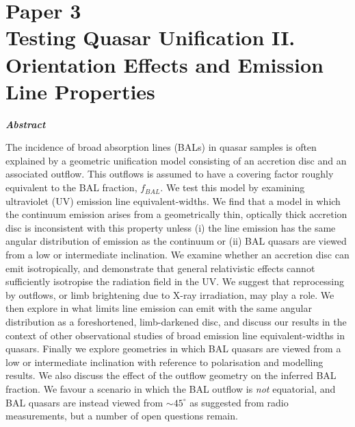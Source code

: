 \chapter{Paper 3 \\ Testing Quasar Unification II. Orientation Effects and Emission Line Properties}

\def\py{\textsc{python}}
\def\tar{\textsc{tardis}}
\def\cld{\textsc{cloudy}}
\def\agn{\textsc{agnspec}}
\def\kerrtrans{\textsc{kerrtrans}}


\def\civ{C~\textsc{iv}}
\def\nv{N~\textsc{v}}
\def\heii{He~\textsc{ii}}
\def\ovi{O~\textsc{vi}}
\def\la{Ly$\alpha$}
\def\ha{H$\alpha$}
\def\ept{$\epsilon(\theta)$}

\def\araa{ARAA}
\def\nat{Nature}
\def\apjl{ApJ Letters}
\def\aapr{AAPR}
\def\ssr{SSR}
\def\apj{ApJ}
\def\apjs{ApJs}
\def\pasp{PASP}
\def\aap{A\&A}
\def\mnras{MNRAS}
\def\aj{AJ}
\def\rmxaa{RMXAA}
\def\ew{{\rm EW}}


%
%
\maketitle

\clearpage

{\bf{\sl{\huge Abstract}}}

The incidence of broad absorption lines (BALs) in quasar samples is 
often explained by a geometric unification model consisting
of an accretion disc and an associated outflow.
This outflows is assumed to have a covering factor roughly equivalent to
the BAL fraction, $f_{BAL}$. We test this model
by examining ultraviolet (UV) emission line equivalent-widths. 
We find that a model in which the 
continuum emission arises from a geometrically thin, 
optically thick accretion disc is inconsistent with this property
unless (i) the line emission has the same angular distribution of 
emission as the continuum or (ii) BAL quasars are viewed from a low or intermediate inclination. 
We examine whether an accretion disc can emit isotropically, and
demonstrate that general relativistic effects cannot sufficiently isotropise the 
radiation field in the UV. 
We suggest that reprocessing by outflows, or limb brightening due to X-ray irradiation, may play a role.
We then explore in what limits line emission can emit with the same angular
distribution as a foreshortened, limb-darkened disc, and discuss our results
in the context of other observational studies of broad emission line 
equivalent-widths in quasars.
Finally we explore geometries in which BAL quasars are viewed
from a low or intermediate inclination with reference to polarisation
and modelling results. We also discuss the effect of the outflow 
geometry on the inferred BAL fraction. We favour a scenario in which the 
BAL outflow is {\em not} equatorial, and BAL quasars
are instead viewed from $\sim45^\circ$ as suggested from radio measurements,
but a number of open questions remain.

